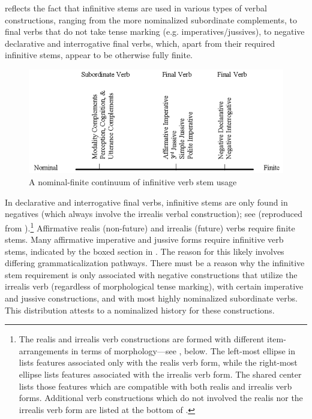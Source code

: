 \documentclass[output=paper]{langsci/langscibook}
\begin{document}
 reflects the fact that infinitive stems are used in various types of verbal constructions, ranging from the more nominalized subordinate complements, to final verbs that do not take tense marking (e.g. imperatives/jussives), to negative declarative and interrogative final verbs, which, apart from their required infinitive stems, appear to be otherwise fully finite. 

\begin{figure}
\includegraphics[width=\textwidth]{figures/MAhlandFig1.png}	
\caption{A nominal-finite continuum of infinitive verb stem usage}
\label{fig:1}
\end{figure}

In declarative and interrogative final verbs, infinitive stems are only found in negatives (which always involve the irrealis verbal construction); see  (reproduced from \citealt[266]{Ahland2012}).\footnote{The realis and irrealis verb constructions are formed with different item-arrangements in terms of morphology—see , below. The left-most ellipse in  lists features associated only with the realis verb form, while the right-most ellipse lists features associated with the irrealis verb form. The shared center lists those features which are compatible with both realis and irrealis verb forms. Additional verb constructions which do not involved the realis nor the irrealis verb form are listed at the bottom of .} Affirmative realis (non-future) and irrealis (future) verbs require finite stems. Many affirmative imperative and jussive forms require infinitive verb stems, indicated by the boxed section in . The reason for this likely involves differing grammaticalization pathways. There must be a reason why the infinitive stem requirement is only associated with negative constructions that utilize the irrealis verb (regardless of morphological tense marking), with certain imperative and jussive constructions, and with most highly nominalized subordinate verbs. This distribution attests to a nominalized history for these constructions. 
 
\end{document}
